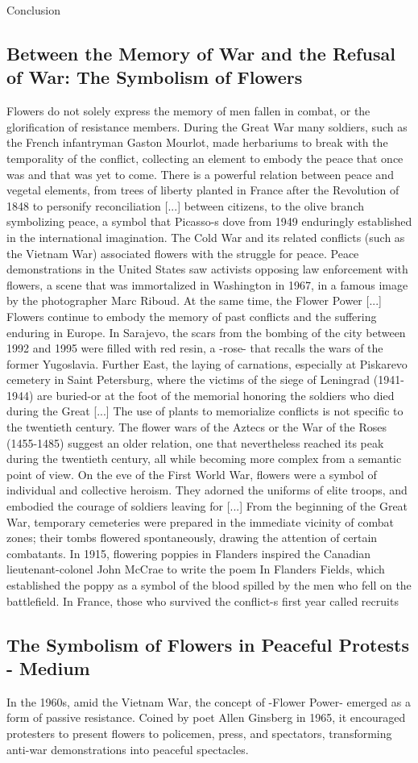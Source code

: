 \documentclass[12pt]{article}
\begin{document}
Conclusion\subsection{Between the Memory of War and the Refusal of War: The Symbolism of Flowers}
Flowers do not solely express the memory of men fallen in combat, or the glorification of resistance members. During the Great War many soldiers, such as the French infantryman Gaston Mourlot, made herbariums to break with the temporality of the conflict, collecting an element to embody the peace that once was and that was yet to come. There is a powerful relation between peace and vegetal elements, from trees of liberty planted in France after the Revolution of 1848 to personify reconciliation [...] between citizens, to the olive branch symbolizing peace, a symbol that Picasso-s dove from 1949 enduringly established in the international imagination. The Cold War and its related conflicts (such as the Vietnam War) associated flowers with the struggle for peace. Peace demonstrations in the United States saw activists opposing law enforcement with flowers, a scene that was immortalized in Washington in 1967, in a famous image by the photographer Marc Riboud. At the same time, the Flower Power [...] Flowers continue to embody the memory of past conflicts and the suffering enduring in Europe. In Sarajevo, the scars from the bombing of the city between 1992 and 1995 were filled with red resin, a -rose- that recalls the wars of the former Yugoslavia. Further East, the laying of carnations, especially at Piskarevo cemetery in Saint Petersburg, where the victims of the siege of Leningrad (1941-1944) are buried-or at the foot of the memorial honoring the soldiers who died during the Great [...] The use of plants to memorialize conflicts is not specific to the twentieth century. The flower wars of the Aztecs or the War of the Roses (1455-1485) suggest an older relation, one that nevertheless reached its peak during the twentieth century, all while becoming more complex from a semantic point of view. On the eve of the First World War, flowers were a symbol of individual and collective heroism. They adorned the uniforms of elite troops, and embodied the courage of soldiers leaving for [...] From the beginning of the Great War, temporary cemeteries were prepared in the immediate vicinity of combat zones; their tombs flowered spontaneously, drawing the attention of certain combatants. In 1915, flowering poppies in Flanders inspired the Canadian lieutenant-colonel John McCrae to write the poem In Flanders Fields, which established the poppy as a symbol of the blood spilled by the men who fell on the battlefield. In France, those who survived the conflict-s first year called recruits\subsection{The Symbolism of Flowers in Peaceful Protests - Medium}
In the 1960s, amid the Vietnam War, the concept of -Flower Power- emerged as a form of passive resistance. Coined by poet Allen Ginsberg in 1965, it encouraged protesters to present flowers to policemen, press, and spectators, transforming anti-war demonstrations into peaceful spectacles.
\end{document}
